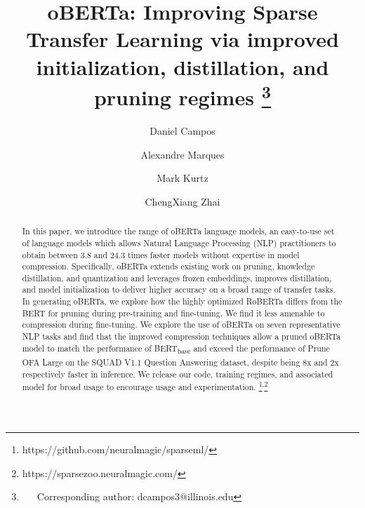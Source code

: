 \documentclass[11pt]{article}
\title{oBERTa: Improving Sparse Transfer Learning via improved initialization, distillation, and pruning regimes \thanks{~~~Corresponding author: dcampos3@illinois.edu} }
\author[1]{Daniel Campos }
\author[2]{Alexandre Marques}
\author[2]{Mark Kurtz}
\author[1]{ChengXiang Zhai}
\affil[1]{Department of Computer Science, the University of Illinois Urbana-Champaign}
\affil[2]{Neural Magic Inc.}
\begin{document}
\maketitle
\begin{abstract}
In this paper, we introduce the range of oBERTa language models, an easy-to-use set of language models which allows Natural Language Processing (NLP) practitioners to obtain between 3.8 and 24.3 times faster models without expertise in model compression. Specifically, oBERTa extends existing work on pruning, knowledge distillation, and quantization and leverages frozen embeddings, improves distillation, and model initialization to deliver higher accuracy on a broad range of transfer tasks. In generating oBERTa, we explore how the highly optimized RoBERTa differs from the BERT for pruning during  pre-training and fine-tuning. We find it less amenable to compression during  fine-tuning. We explore the use of oBERTa on seven representative NLP tasks and find that the improved compression techniques allow a pruned oBERTa model to match the performance of BERT\textsubscript{base} and exceed the performance of Prune OFA Large on the SQUAD V1.1 Question Answering dataset, despite being 8x and 2x respectively faster in inference. We release our code, training regimes, and associated model for broad usage to encourage usage and experimentation. \footnote{https://github.com/neuralmagic/sparseml/}\textsuperscript{,}\footnote{https://sparsezoo.neuralmagic.com/}
\end{abstract}
\end{document}
